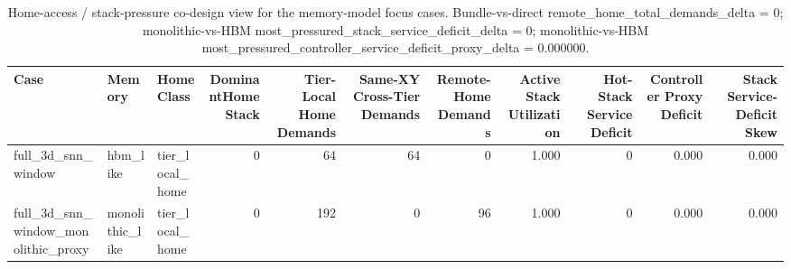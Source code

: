 \begin{table}[t]
  \centering
  \caption{Home-access / stack-pressure co-design view for the memory-model focus cases. Bundle-vs-direct remote\_home\_total\_demands\_delta = 0; monolithic-vs-HBM most\_pressured\_stack\_service\_deficit\_delta = 0; monolithic-vs-HBM most\_pressured\_controller\_service\_deficit\_proxy\_delta = 0.000000.}
  \begin{tabular}{l l l r r r r r r r r}
  \hline
  Case & Memory & HomeClass & DominantHomeStack & Tier-Local Home Demands & Same-XY Cross-Tier Demands & Remote-Home Demands & Active Stack Utilization & Hot-Stack Service Deficit & Controller Proxy Deficit & Stack Service-Deficit Skew \\
  \hline
  full\_3d\_snn\_window & hbm\_like & tier\_local\_home & 0 & 64 & 64 & 0 & 1.000 & 0 & 0.000 & 0.000 \\
  full\_3d\_snn\_window\_monolithic\_proxy & monolithic\_like & tier\_local\_home & 0 & 192 & 0 & 96 & 1.000 & 0 & 0.000 & 0.000 \\
  \hline
  \end{tabular}
\end{table}
